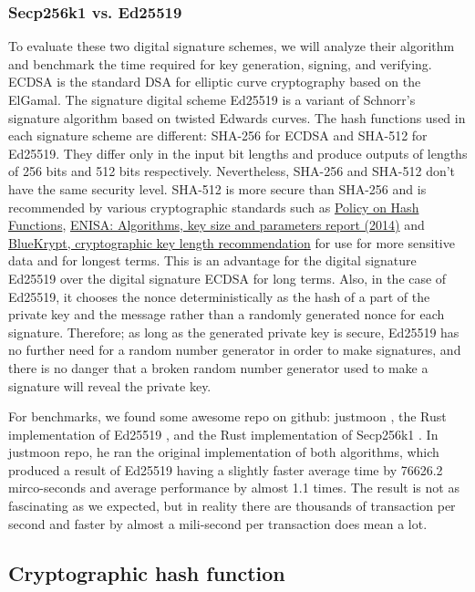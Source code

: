 \subsubsection{Secp256k1 vs. Ed25519}

To evaluate these two digital signature schemes, we will analyze their algorithm and benchmark the time required for key generation, signing, and verifying. ECDSA is the standard DSA for elliptic curve cryptography based on the ElGamal. The signature digital scheme Ed25519 is a variant of Schnorr’s signature algorithm based on twisted Edwards curves. The hash functions used in each signature scheme are different: SHA-256 for ECDSA and SHA-512 for Ed25519. They differ only in the input bit lengths and produce outputs of lengths of 256 bits and 512 bits respectively. Nevertheless, SHA-256 and SHA-512 don’t have the same security level. SHA-512 is more secure than SHA-256 and is recommended by various cryptographic standards such as \href{https://csrc.nist.gov/projects/hash-functions/nist-policy-on-hash-functions}{Policy on Hash Functions}, \href{https://www.enisa.europa.eu/publications}{ENISA: Algorithms, key size and parameters report (2014)} and \href{https://www.keylength.com/en/}{BlueKrypt, cryptographic key length recommendation} for use for more sensitive data and for longest terms. This is an advantage for the digital signature Ed25519 over the digital signature ECDSA for long terms. Also, in the case of Ed25519, it chooses the nonce deterministically as the hash of a part of the private key and the message rather than a randomly generated nonce for each signature. Therefore; as long as the generated private key is secure, Ed25519 has no further need for a random number generator in order to make signatures, and there is no danger that a broken random number generator used to make a signature will reveal the private key.

For benchmarks, we found some awesome repo on github: justmoon \cite{justmoon}, the Rust implementation of Ed25519 \cite{dalek}, and the Rust implementation of Secp256k1 \cite{tarcieri}. In justmoon repo, he ran the original implementation of both algorithms, which produced a result of Ed25519 having a slightly faster average time by 76626.2 mirco-seconds and average performance by almost 1.1 times. The result is not as fascinating as we expected, but in reality there are thousands of transaction per second and faster by almost a mili-second per transaction does mean a lot.

\subsection{Cryptographic hash function}

